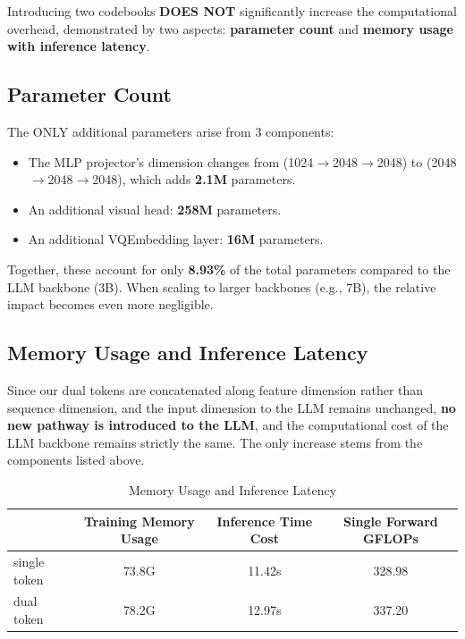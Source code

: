 Introducing two codebooks \textbf{DOES NOT} significantly increase the computational overhead, demonstrated by two aspects: \textbf{parameter count} and \textbf{memory usage with inference latency}.

\subsection{Parameter Count}

The ONLY additional parameters arise from 3 components:
\begin{itemize}[leftmargin=*]
    \item The MLP projector's dimension changes from (1024$\rightarrow$2048$\rightarrow$2048) to (2048$\rightarrow$2048$\rightarrow$2048), which adds \textbf{2.1M} parameters.
    \item An additional visual head: \textbf{258M} parameters.
    \item An additional VQEmbedding layer: \textbf{16M} parameters.
\end{itemize}

Together, these account for only \textbf{8.93\%} of the total parameters compared to the LLM backbone (3B). When scaling to larger backbones (e.g., 7B), the relative impact becomes even more negligible.

\subsection{Memory Usage and Inference Latency}

Since our dual tokens are concatenated along feature dimension rather than sequence dimension, and the input dimension to the LLM remains unchanged, \textbf{no new pathway is introduced to the LLM}, and the computational cost of the LLM backbone remains strictly the same. The only increase stems from the components listed above.

\begin{table}[ht]
\centering
\caption{Memory Usage and Inference Latency}
\label{tab:memory}
\begin{tabular}{lccc}
\toprule
 & Training Memory Usage & Inference Time Cost & Single Forward GFLOPs \\
\midrule
single token & 73.8G & 11.42s & 328.98 \\
dual token   & 78.2G & 12.97s & 337.20 \\
\bottomrule
\end{tabular}
\end{table}

